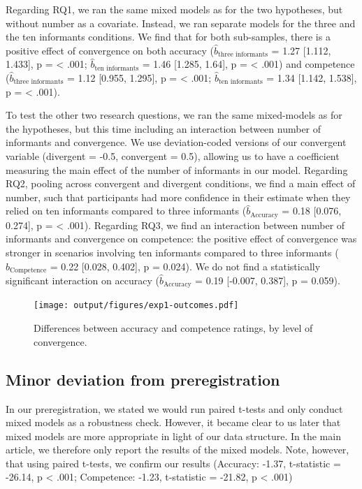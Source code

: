 \documentclass[
  doc,floatsintext]{apa6}
\begin{document}
Regarding RQ1, we ran the same mixed models as for the two hypotheses, but without number as a covariate. Instead, we ran separate models for the three and the ten informants conditions. We find that for both sub-samples, there is a positive effect of convergence on both accuracy (\(\hat{b}_{\text{three informants}}\) = 1.27 {[}1.112, 1.433{]}, p = \textless{} .001; \(\hat{b}_{\text{ten informants}}\) = 1.46 {[}1.285, 1.64{]}, p = \textless{} .001) and competence (\(\hat{b}_{\text{three informants}}\) = 1.12 {[}0.955, 1.295{]}, p = \textless{} .001; \(\hat{b}_{\text{ten informants}}\) = 1.34 {[}1.142, 1.538{]}, p = \textless{} .001).

To test the other two research questions, we ran the same mixed-models as for the hypotheses, but this time including an interaction between number of informants and convergence. We use deviation-coded versions of our convergent variable (divergent = -0.5, convergent = 0.5), allowing us to have a coefficient measuring the main effect of the number of informants in our model. Regarding RQ2, pooling across convergent and divergent conditions, we find a main effect of number, such that participants had more confidence in their estimate when they relied on ten informants compared to three informants (\(\hat{b}_{\text{Accuracy}}\) = 0.18 {[}0.076, 0.274{]}, p = \textless{} .001). Regarding RQ3, we find an interaction between number of informants and convergence on competence: the positive effect of convergence was stronger in scenarios involving ten informants compared to three informants (\(\hat{b}_{\text{Competence}}\) = 0.22 {[}0.028, 0.402{]}, p = 0.024). We do not find a statistically significant interaction on accuracy (\(\hat{b}_{\text{Accuracy}}\) = 0.19 {[}-0.007, 0.387{]}, p = 0.059).



\begin{figure}
\centering
\texttt{[image: output/figures/exp1-outcomes.pdf]}
\caption{\label{fig:exp1-outcomes}Differences between accuracy and competence ratings, by level of convergence.}
\end{figure}

\subsection{Minor deviation from preregistration}\label{minor-deviation-from-preregistration}

In our preregistration, we stated we would run paired t-tests and only conduct mixed models as a robustness check. However, it became clear to us later that mixed models are more appropriate in light of our data structure. In the main article, we therefore only report the results of the mixed models. Note, however, that using paired t-tests, we confirm our results (Accuracy: -1.37, t-statistic = -26.14, p \textless{} .001; Competence: -1.23, t-statistic = -21.82, p \textless{} .001)
\end{document}
